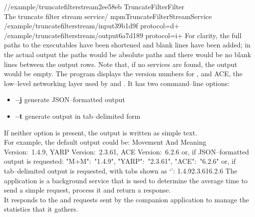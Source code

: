 /\serviceName/example/truncatefilterstream\textunderscore{}2ee58eb\pseudotab{}%
TruncateFilter\pseudotab{}Filter\pseudotab\\
The truncate filter stream service\pseudotwotabs\textellipsis/%
mpmTruncateFilterStreamService\pseudotab\\
/example/truncatefilterstream/input\textunderscore{}39b1d9f\textbraceleft{}%
protocol=d+\textbraceright\pseudotab\\
/example/truncatefilterstream/output\textunderscore{}6a7d189\textbraceleft{}%
protocol=i+\textbraceright
\outputEnd{}
For clarity, the full paths to the executables have been shortened and blank lines have
been added; in the actual output the paths would be absolute paths and there would be no
blank lines between the output rows.
Note that, if no services are found, the output would be empty.
The program  displays the version numbers for \mplusm{}, \yarp{}
and ACE, the low--level networking layer used by \mplusm{} and \yarp{}.
It has two command--line options:
\begin{itemize}
\item \textbf{--j} generate JSON--formatted output
\item \textbf{--t} generate output in tab--delimited form
\end{itemize}
If neither option is present, the output is written as simple text.\\

For example, the default output could be:
\outputBegin{}
Movement And Meaning Version:\ 1.4.9, YARP Version:\ 2.3.61, ACE Version:\ 6.2.6
\outputEnd{}
or, if JSON--formatted output is requested:
\outputBegin{}
\textbraceleft{} "M+M":\ "1.4.9", "YARP":\ "2.3.61", "ACE":\ "6.2.6" \textbraceright
\outputEnd{}
or, if tab--delimited output is requested, with tabs shown as
`\texttt{\boldmath{$\vdash$}}':
\outputBegin{}
1.4.9\pseudotab{}2.3.61\pseudotab{}6.2.6
\outputEnd{}
\secondaryEnd{}
\newpage
{}
The  application is a background service that is
used to determine the average time to send a simple request, process it and return a
response.\\

It responds to the  and
 requests sent by the
companion application  to manage the statistics
that it gathers.\\


